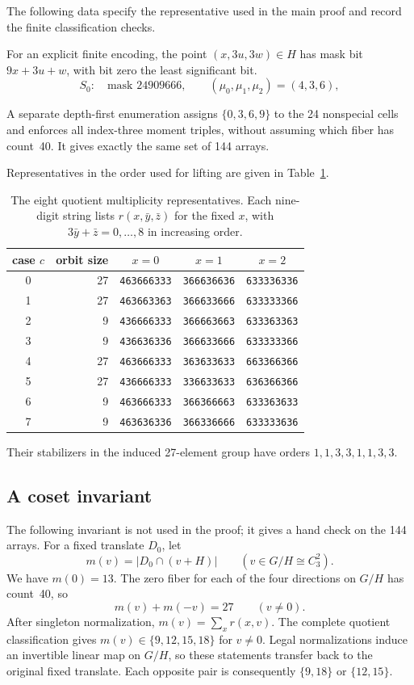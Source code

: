 \documentclass[11pt]{article}
\begin{document}
\begin{appendices}
The following data specify the representative used in the main proof
and record the finite classification checks.

For an explicit finite encoding, the point $(x,3u,3w)\in H$
has mask bit $9x+3u+w$, with bit zero the least significant bit.
\begin{equation}\label{eq:mask}
 S_0:\quad\text{mask }24909666,
 \qquad (\mu_0,\mu_1,\mu_2)=(4,3,6),
\end{equation}

A separate depth-first
enumeration assigns $\{0,3,6,9\}$ to the 24 nonspecial
cells and enforces all index-three moment triples,
without assuming which fiber has count~40. It gives
exactly the same set of 144 arrays.

Representatives in the order used for lifting are given
in Table~\ref{tab:cases}. \begin{table}[ht]
\centering
\begin{tabular}{c|r|ccc}
case $c$&orbit size&$x=0$&$x=1$&$x=2$\\\hline
0&27&\texttt{463666333}&\texttt{366636636}&\texttt{633336336}\\
1&27&\texttt{463663363}&\texttt{366633666}&\texttt{633333366}\\
2&9 &\texttt{436666333}&\texttt{366663663}&\texttt{633363363}\\
3&9 &\texttt{436636336}&\texttt{366633666}&\texttt{633333366}\\
4&27&\texttt{463666333}&\texttt{363633633}&\texttt{663366366}\\
5&27&\texttt{436666333}&\texttt{336633633}&\texttt{636366366}\\
6&9 &\texttt{463666333}&\texttt{366366663}&\texttt{633363633}\\
7&9 &\texttt{463636336}&\texttt{366336666}&\texttt{633333636}
\end{tabular}
\caption{The eight quotient multiplicity representatives. Each
nine-digit string lists $r(x,\bar y,\bar z)$ for the fixed $x$, with
$3\bar y+\bar z=0,\ldots,8$ in increasing order.}
\label{tab:cases}
\end{table}

Their stabilizers in the induced 27-element group have orders
$1,1,3,3,1,1,3,3$.

\subsection{A coset invariant}\label{sec:invariant}

The following invariant is not used in the proof; it gives a hand check
on the 144 arrays. For a fixed translate $D_0$, let
\[
 m(v)=|D_0\cap(v+H)|\qquad(v\in G/H\cong C_3^2).
\]
We have $m(0)=13$. The zero fiber for each of the four
directions on $G/H$ has count~40, so
\[
 m(v)+m(-v)=27\qquad(v\ne0).
\]
After singleton normalization, $m(v)=\sum_xr(x,v)$.
The complete quotient classification gives
$m(v)\in\{9,12,15,18\}$ for $v\ne0$.
Legal normalizations induce an invertible linear map on
$G/H$, so these statements transfer back to the original
fixed translate. Each opposite pair is consequently
$\{9,18\}$ or $\{12,15\}$.


\end{appendices}
\end{document}
